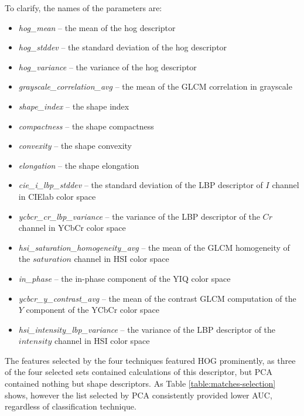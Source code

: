 \documentclass[letterpaper, notitlepage]{report}
\begin{document}
 To clarify, the names of the parameters are:
 \begin{itemize}
 	\item{\textit{hog\_mean} -- the mean of the hog descriptor}
 	\item{\textit{hog\_stddev} -- the standard deviation of the hog descriptor}
 	\item{\textit{hog\_variance} -- the variance of the hog descriptor}
 	\item{\textit{grayscale\_correlation\_avg} -- the mean of the GLCM correlation in grayscale}
 	\item{\textit{shape\_index} -- the shape index}
 	\item{\textit{compactness} -- the shape compactness}
 	\item{\textit{convexity} -- the shape convexity}
 	\item{\textit{elongation} -- the shape elongation}
 	\item{\textit{cie\_i\_lbp\_stddev} -- the standard deviation of the LBP descriptor of $I$ channel in CIElab color space}
 	\item{\textit{ycbcr\_cr\_lbp\_variance} -- the variance of the LBP descriptor of the $Cr$ channel in YCbCr color space}
 	\item{\textit{hsi\_saturation\_homogeneity\_avg} -- the mean of the GLCM homogeneity of the $saturation$ channel in HSI color space}
 	\item{\textit{in\_phase} -- the in-phase component of the YIQ color space}
 	\item{\textit{ycbcr\_y\_contrast\_avg} -- the mean of the contrast GLCM computation of the $Y$ component of the YCbCr color space}
 	\item{\textit{hsi\_intensity\_lbp\_variance} -- the variance of the LBP descriptor of the $intensity$ channel in HSI color space}
 \end{itemize}
 
The features selected by the four techniques featured HOG prominently, as three of the four selected sets contained calculations of this descriptor, but PCA contained nothing but shape descriptors. As Table \ref{table:matches-selection} shows, however the list selected by PCA consistently provided lower AUC, regardless of classification technique.
 	
\end{document}
